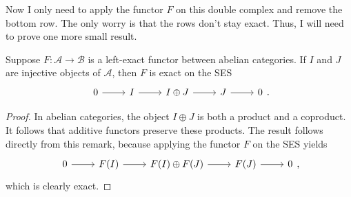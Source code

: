 Now I only need to apply the functor $F$ on this double complex
and remove the bottom row. The only worry is that the rows don't stay
exact. Thus, I will need to prove one more small result.
\begin{lemm}
  Suppose $F:\mathcal{A}\to\mathcal{B}$ is a left-exact functor between
  abelian categories. If $I$ and $J$ are injective objects of $\mathcal{A}$,
  then $F$ is exact on the SES
  \[\begin{tikzcd}
      0\rar & I\rar & I\oplus J\rar & J\rar & 0
    \end{tikzcd}.\]
\end{lemm}
\begin{proof}
  In abelian categories, the object $I\oplus J$ is both a product and
  a coproduct. It follows that additive functors preserve these products.
  The result follows directly from this remark, because applying the functor
  $F$ on the SES yields
  \[\begin{tikzcd}
      0\rar & F(I)\rar & F(I)\oplus F(J)\rar & F(J)\rar & 0
    \end{tikzcd},\]
  which is clearly exact.
\end{proof}


